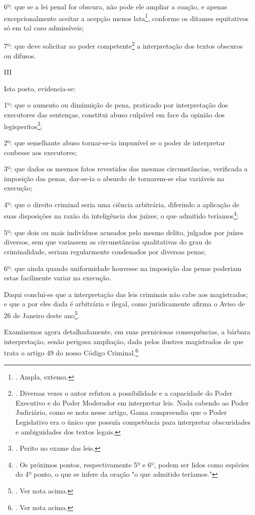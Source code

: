 6º: que se a lei penal for obscura, não pode ele ampliar a coação, e
apenas excepcionalmente aceitar a acepção menos lata\footnote{. Ampla,
  extensa.}, conforme os ditames equitativos só em tal caso admissíveis;

7º: que deve solicitar ao poder competente\footnote{. Diversas vezes o
  autor refutou a possibilidade e a capacidade do Poder Executivo e do
  Poder Moderador em interpretar leis. Nada cabendo ao Poder Judiciário,
  como se nota nesse artigo, Gama compreendia que o Poder Legislativo
  era o único que possuía competência para interpretar obscuridades e
  ambiguidades dos textos legais.} a interpretação dos textos obscuros
ou difusos.

III

Isto posto, evidencia-se:

1º: que o aumento ou diminuição de pena, praticado por interpretação dos
executores das sentenças, constitui abuso culpável em face da opinião
dos legisperitos\footnote{. Perito no exame das leis.};

2º: que semelhante abuso tornar-se-ia impunível se o poder de
interpretar coubesse aos executores;

3º: que dados os mesmos fatos revestidos das mesmas circunstâncias,
verificada a imposição das penas, dar-se-ia o absurdo de tornarem-se
elas variáveis na execução;

4º: que o direito criminal seria uma ciência arbitrária, diferindo a
aplicação de suas disposições na razão da inteligência dos juízes; o que
admitido teríamos\footnote{. Os próximos pontos, respectivamente 5º e
  6º, podem ser lidos como espécies do 4º ponto, o que se infere da
  oração "o que admitido teríamos."};

5º: que dois ou mais indivíduos acusados pelo mesmo delito, julgados por
juízes diversos, sem que variassem as circunstâncias qualitativas do
grau de criminalidade, seriam regularmente condenados por diversas
penas;

6º: que ainda quando uniformidade houvesse na imposição das penas
poderiam estas facilmente variar na execução.

Daqui conclui-se que a interpretação das leis criminais não cabe aos
magistrados; e que a por eles dada é arbitrária e ilegal, como
juridicamente afirma o Aviso de 26 de Janeiro deste ano\footnote{. Ver
  nota acima.}.

Examinemos agora detalhadamente, em suas perniciosas consequências, a
bárbara interpretação, senão perigosa ampliação, dada pelos ilustres
magistrados de que trata o artigo 49 do nosso Código
Criminal.\footnote{. Ver nota acima.}

